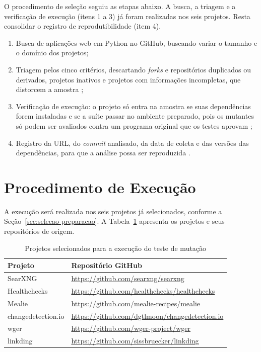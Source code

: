O procedimento de seleção seguiu as etapas abaixo. A busca, a triagem e a verificação de execução (itens 1 a 3) já foram realizadas nos seis projetos. Resta consolidar o registro de reprodutibilidade (item 4).

\begin{enumerate}
    \item Busca de aplicações web em Python no GitHub, buscando variar o tamanho e o domínio dos projetos;
    \item Triagem pelos cinco critérios, descartando \textit{forks} e repositórios duplicados ou derivados, projetos inativos e projetos com informações incompletas, que distorcem a amostra \cite{vidoni2022};
    \item Verificação de execução: o projeto só entra na amostra se suas dependências forem instaladas e se a suíte passar no ambiente preparado, pois os mutantes só podem ser avaliados contra um programa original que os testes aprovam \cite{ammann2016};
    \item Registro da URL, do \textit{commit} analisado, da data de coleta e das versões das dependências, para que a análise possa ser reproduzida \cite{vidoni2022}.
\end{enumerate}


\section{Procedimento de Execução}
\label{sec:execucao-mutantes}

A execução será realizada nos seis projetos já selecionados, conforme a Seção~\ref{sec:selecao-preparacao}. A Tabela~\ref{tab:projetos-selecionados} apresenta os projetos e seus repositórios de origem.

\begin{table}[htb]
    \centering
    \caption{Projetos selecionados para a execução do teste de mutação}
    \label{tab:projetos-selecionados}
    \begin{tabular}{@{}ll@{}}
        \toprule
        \textbf{Projeto} & \textbf{Repositório GitHub} \\
        \midrule
        SearXNG & \url{https://github.com/searxng/searxng} \\
        Healthchecks & \url{https://github.com/healthchecks/healthchecks} \\
        Mealie & \url{https://github.com/mealie-recipes/mealie} \\
        changedetection.io & \url{https://github.com/dgtlmoon/changedetection.io} \\
        wger & \url{https://github.com/wger-project/wger} \\
        linkding & \url{https://github.com/sissbruecker/linkding} \\
        \bottomrule
    \end{tabular}
\end{table}

